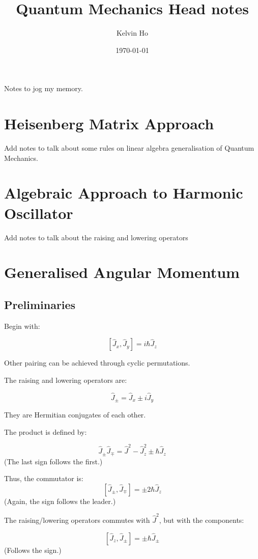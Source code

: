 \documentclass[11pt]{article}
\author{Kelvin Ho}
\date{\today}
\title{Quantum Mechanics Head notes}
\begin{document}
\maketitle
\tableofcontents

Notes to jog my memory.

\section{Heisenberg Matrix Approach}
\label{sec:orgbe8c3d0}

Add notes to talk about some rules on linear algebra generalisation of
Quantum Mechanics.

\section{Algebraic Approach to Harmonic Oscillator}
\label{sec:org12c6c1a}

Add notes to talk about the raising and lowering operators

\section{Generalised Angular Momentum}
\label{sec:org99167db}

\subsection{Preliminaries}
\label{sec:orge2323e0}

Begin with:

\[ \left[ \hat{J}_x, \hat{J}_y \right] = i\hbar \hat{J}_z \]

Other pairing can be achieved through cyclic permutations.

The raising and lowering operators are:

\[ \hat{J}_\pm = \hat{J}_x \pm i\hat{J}_y \]

They are Hermitian conjugates of each other. 

The product is defined by:

\[ \hat{J}_\pm\hat{J}_\mp = \hat{J}^2 - \hat{J}^2_z \pm \hbar\hat{J}_z\]
(The last sign follows the first.)

Thus, the commutator is:
\[ \left[ \hat{J}_\pm,\hat{J}_\mp\right] = \pm 2\hbar\hat{J}_z\]
(Again, the sign follows the leader.)

The raising/lowering operators commutes with \(\hat{J}^2\), but with the
components:

\[ \left[ \hat{J}_z, \hat{J}_\pm \right] = \pm \hbar\hat{J}_\pm \]
(Follows the sign.)
\end{document}
